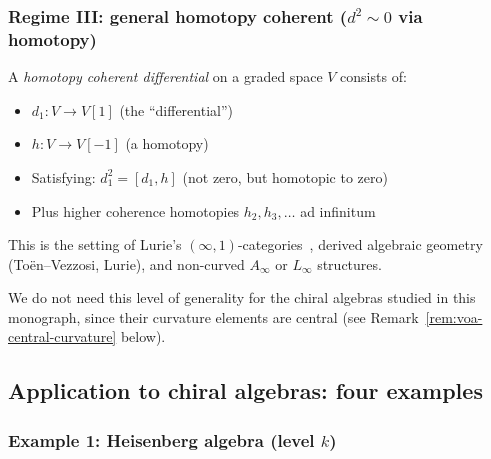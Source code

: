 \subsubsection{\texorpdfstring{Regime III: general homotopy coherent ($d^2 \sim 0$ via homotopy)}{Regime III: general homotopy coherent (d2 0 via homotopy)}}

\begin{definition}\label{def:homotopy-coherent}
A \emph{homotopy coherent differential} on a graded space $V$ consists of:
\begin{itemize}
\item $d_1: V \to V[1]$ (the ``differential'')
\item $h: V \to V[-1]$ (a homotopy)
\item Satisfying: $d_1^2 = [d_1, h]$ (not zero, but homotopic to zero)
\item Plus higher coherence homotopies $h_2, h_3, \ldots$ ad infinitum
\end{itemize}
\end{definition}

This is the setting of Lurie's $(\infty, 1)$-categories~\cite{HTT}, derived algebraic geometry (To\"en--Vezzosi, Lurie), and non-curved $A_\infty$ or $L_\infty$ structures.

We do not need this level of generality for the chiral algebras studied in this monograph, since their curvature elements are central (see Remark~\ref{rem:voa-central-curvature} below).

\subsection{Application to chiral algebras: four examples}

\subsubsection{\texorpdfstring{Example 1: Heisenberg algebra (level $k$)}{Example 1: Heisenberg algebra (level k)}}

